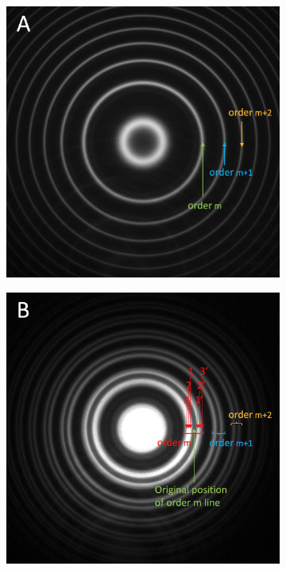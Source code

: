 \documentclass[11pt]{article}
\begin{document}
\begin{figure}[h!]
    \centering
    \begin{subfigure}{0.47\linewidth}
        \includegraphics[width=\linewidth]{Cd green/A.png}
    \end{subfigure}
    \begin{subfigure}{0.47\linewidth}
        \includegraphics[width=\linewidth]{Cd green/B.png}

\end{subfigure}
\end{figure}
\end{document}
